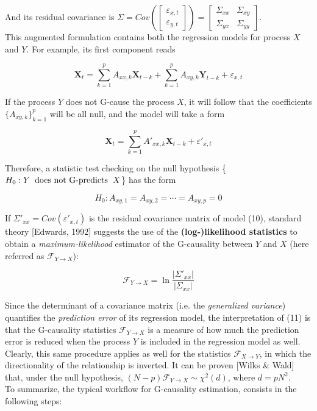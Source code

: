 \documentclass[a4paper]{article}
\begin{document}
And its residual covariance is $ \Sigma = Cov\left(\begin{bmatrix} \varepsilon_{x,t}  \\  \varepsilon_{y,t} \end{bmatrix}\right) = \begin{bmatrix} \Sigma_{xx}  &  \Sigma_{xy} \\  \Sigma_{yx}  & \Sigma_{yy} \end{bmatrix} $.\\
This augmented formulation contains both the regression models for process $X$ and $Y$. For example, its first component reads

\begin{equation}
\textbf{X}_t = \sum_{k=1}^{p} A_{xx,k} \textbf{X}_{t-k} + \sum_{k=1}^{p} A_{xy,k}  \textbf{Y}_{t-k} + \varepsilon_{x,t}
\end{equation}

If the process $Y$ does not G-cause the process $X$, it will follow that the coefficients $\{A_{xy,k}\}_{k=1}^p $ will be all null, and the model will take a form

\begin{equation}
\textbf{X}_t = \sum_{k=1}^{p} A'_{xx,k} \textbf{X}_{t-k} + \varepsilon'_{x,t}
\end{equation}

 Therefore, a statistic test checking on the null hypothesis \{$ H_0:  Y \hspace{0.2cm} \text{does not G-predicts} \hspace{0.2 cm} X $\} has the form

\begin{equation}
H_0: A_{xy,1} = A_{xy,2} = \cdots = A_{xy,p} = 0
\end{equation}


If  $\Sigma'_{xx} = Cov(\varepsilon'_{x,t}) $ is the residual covariance matrix of model (10), standard theory [Edwards, 1992] suggests the use of the \textbf{(log-)likelihood statistics} to obtain a \textit{maximum-likelihood} estimator of the G-causality between $Y$ and $X$ (here referred as $ \mathcal{F}_{Y \rightarrow X} $):

\begin{equation}
	\mathcal{F}_{Y \rightarrow X}  = \ln \frac{|\Sigma'_{xx}|}{|\Sigma_{xx}|}
\end{equation}


Since the determinant of a covariance matrix (i.e. the \textit{generalized variance}) quantifies the \textit{prediction error} of its regression model, the interpretation of (11) is that the G-causality statistics  $ \mathcal{F}_{Y \rightarrow X} $ is a measure of how much the prediction error is reduced when the process $Y$ is included in the regression model as well. Clearly, this same procedure applies as well for the statistics  $ \mathcal{F}_{X \rightarrow Y} $, in which the directionality of the relationship is inverted. It can be proven [Wilks \& Wald] that, under the null hypothesis, $ (N-p)\mathcal{F}_{Y \rightarrow X} \sim \chi^2(d)$, where $ d = pN^2$.
\\
To summarize, the typical workflow for G-causality estimation, consists in the following steps:
\end{document}

